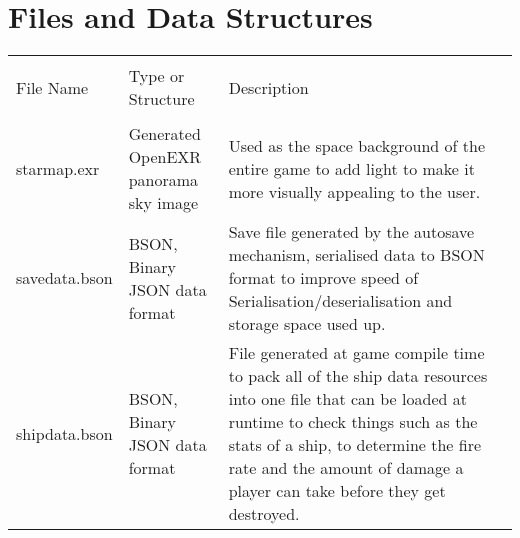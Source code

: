 \documentclass[12pt, DIV=calc]{scrartcl}
\begin{document}
\clearpage
\section{Files and Data Structures}
\begin{xltabular}[c]{\textwidth}{| X | X | X |}
    \hline \\
File Name & Type or Structure & Description \\
    \hline \hline \\
starmap.exr & Generated OpenEXR panorama sky image & Used as the space background of the entire game to add light to make it more visually appealing to the user. \\
savedata.bson & BSON, Binary JSON data format  & Save file generated by the autosave mechanism, serialised data to BSON format to improve speed of Serialisation/deserialisation and storage space used up. \\
shipdata.bson & BSON, Binary JSON data format & File generated at game compile time to pack all of the ship data resources into one file that can be loaded at runtime to check things such as the stats of a ship, to determine the fire rate and the amount of damage a player can take before they get destroyed. \\
    \hline
\end{xltabular}

\end{document}
